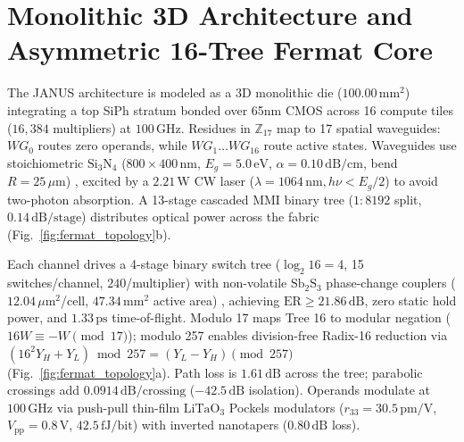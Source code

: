\documentclass[letterpaper,10pt]{article}
\begin{document}
\section{Monolithic 3D Architecture and Asymmetric 16-Tree Fermat Core}
The JANUS architecture is modeled as a 3D monolithic die ($100.00\,\text{mm}^2$) integrating a top SiPh stratum bonded over 65nm CMOS across 16 compute tiles ($16,384$ multipliers) at $100\,\text{GHz}$. Residues in $\mathbb{Z}_{17}$ map to 17 spatial waveguides: $WG_0$ routes zero operands, while $WG_1\dots WG_{16}$ route active states. Waveguides use stoichiometric $\text{Si}_3\text{N}_4$ ($800 \times 400\,\text{nm}$, $E_g = 5.0\,\text{eV}$, $\alpha = 0.10\,\text{dB/cm}$, bend $R = 25\,\mu\text{m}$) \cite{Rahim2021}, excited by a $2.21\,\text{W}$ CW laser ($\lambda = 1064\,\text{nm}, h\nu < E_g/2$) to avoid two-photon absorption. A 13-stage cascaded MMI binary tree ($1:8192$ split, $0.14\,\text{dB/stage}$) distributes optical power across the fabric (Fig.~\ref{fig:fermat_topology}b).

Each channel drives a 4-stage binary switch tree ($\log_2 16 = 4$, 15 switches/channel, $240$/multiplier) with non-volatile $\text{Sb}_2\text{S}_3$ phase-change couplers ($12.04\,\mu\text{m}^2$/cell, $47.34\,\text{mm}^2$ active area) \cite{Dong2019}, achieving $\text{ER} \ge 21.86\,\text{dB}$, zero static hold power, and $1.33\,\text{ps}$ time-of-flight. Modulo 17 maps Tree 16 to modular negation ($16 W \equiv -W \pmod{17}$); modulo 257 enables division-free Radix-16 reduction via $(16^2 Y_H + Y_L) \bmod 257 = (Y_L - Y_H) \pmod{257}$ (Fig.~\ref{fig:fermat_topology}a). Path loss is $1.61\,\text{dB}$ across the tree; parabolic crossings add $0.0914\,\text{dB/crossing}$ ($-42.5\,\text{dB}$ isolation). Operands modulate at $100\,\text{GHz}$ via push-pull thin-film $\text{LiTaO}_3$ Pockels modulators ($r_{33} = 30.5\,\text{pm/V}$, $V_{\text{pp}} = 0.8\,\text{V}$, $42.5\,\text{fJ/bit}$) \cite{Wang2023, Cheng2024Nature} with inverted nanotapers ($0.80\,\text{dB}$ loss).
\end{document}
